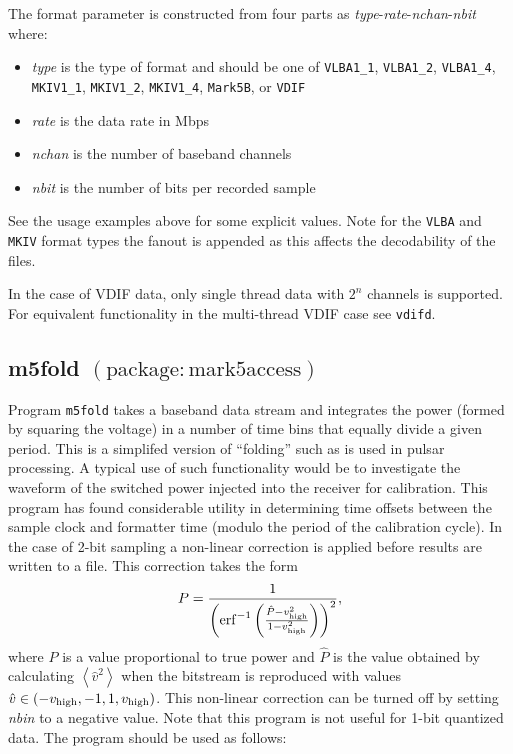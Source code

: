 The format parameter is constructed from four parts as {\em type}-{\em rate}-{\em nchan}-{\em nbit} where:
\begin{itemize}
\item[] {\em type} is the type of format and should be one of {\tt VLBA1\_1}, {\tt VLBA1\_2}, {\tt VLBA1\_4}, {\tt MKIV1\_1}, {\tt MKIV1\_2}, {\tt MKIV1\_4}, {\tt Mark5B}, or {\tt VDIF}
\item[] {\em rate} is the data rate in Mbps
\item[] {\em nchan} is the number of baseband channels
\item[] {\em nbit} is the number of bits per recorded sample
\end{itemize}
See the usage examples above for some explicit values.
Note for the {\tt VLBA} and {\tt MKIV} format types the fanout is appended as this affects the decodability of the files.

In the case of VDIF data, only single thread data with $2^n$ channels is supported.
For equivalent functionality in the multi-thread VDIF case see {\tt vdifd}.












\subsection{m5fold {\small $\mathrm{(package: mark5access)}$}} \label{sec:m5fold}

Program {\tt m5fold} takes a baseband data stream and integrates the power (formed by squaring the voltage) in a number of time bins that equally divide a given period.
This is a simplifed version of ``folding'' such as is used in pulsar processing.
A typical use of such functionality would be to investigate the waveform of the switched power injected into the receiver for calibration.
This program has found considerable utility in determining time offsets between the sample clock and formatter time (modulo the period of the calibration cycle).
In the case of 2-bit sampling a non-linear correction is applied before results are written to a file.
This correction takes the form
\begin{equation}
P = \frac{1}{\left({\rm erf}^{-1}\left(\frac{\hat{P} - v_{\rm high}^2}{1 - v_{\rm high}^2} \right)\right)^2},
\end{equation}
where $P$ is a value proportional to true power and $\hat{P}$ is the value obtained by calculating $\left<\hat{v}^2\right>$ when the bitstream is reproduced with values $\hat{v} \in ( -v_{\rm high}, -1, 1, v_{\rm high} )$. 
This non-linear correction can be turned off by setting {\em nbin} to a negative value.
Note that this program is not useful for 1-bit quantized data.
The program should be used as follows:

